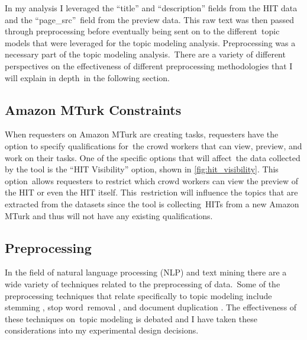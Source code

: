 \documentclass[letterpaper,12pt]{article}
\begin{document}
In my analysis I leveraged the ``title'' and ``description'' fields from the HIT data and the ``page\_src''\
field from the preview data. This raw text was then passed through preprocessing before eventually being sent on to the different\
topic models that were leveraged for the topic modeling analysis. Preprocessing was a necessary part of the topic modeling analysis.\
There are a variety of different perspectives on the effectiveness of different preprocessing methodologies that I will explain in depth\
in the following section.

\subsection{Amazon MTurk Constraints}
When requesters on Amazon MTurk are creating tasks, requesters have the option to specify qualifications for\
the crowd workers that can view, preview, and work on their tasks. One of the specific options that will affect\
the data collected by the tool is the ``HIT Visibility'' option, shown in \ref{fig:hit_visibility}. This option\
allows requesters to restrict which crowd workers can view the preview of the HIT or even the HIT itself. This\
restriction will influence the topics that are extracted from the datasets since the tool is collecting\
HITs from a new Amazon MTurk and thus will not have any existing qualifications.



\subsection{Preprocessing}
In the field of natural language processing (NLP) and text mining there are a wide variety of techniques related to the preprocessing of data.\
Some of the preprocessing techniques that relate specifically to topic modeling include stemming \cite{lovins1968development}, stop word\
removal \cite{silva2003importance}, and document duplication \cite{bouayad1999duplication}. The effectiveness of these techniques on\
topic modeling is debated and I have taken these considerations into my experimental design decisions.
\end{document}
